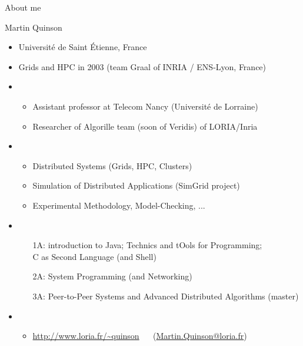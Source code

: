 \begin{frame}{About me}
  \begin{block}{Martin Quinson}
    \begin{itemize}
    \item {} Universit\'e de Saint \'Etienne, France
    \item {} Grids and HPC in 2003 (team Graal of INRIA /
      ENS-Lyon, France)
    \item {}
      \begin{itemize}
      \item Assistant professor at Telecom Nancy (Université de Lorraine)
      \item Researcher of Algorille team (soon of Veridis) of LORIA/Inria
      \end{itemize}
    \item {}
      \begin{itemize}
      \item {} Distributed Systems (Grids, HPC, Clusters)
      \item {} Simulation of Distributed Applications (SimGrid
        project) 
      \item {} Experimental Methodology, Model-Checking, ...
      \end{itemize}
    \item {}
      \begin{itemize}
      \item[1A:]  introduction to Java;
         Technics and tOols for Programming;\\
         C as Second Language (and Shell)
      \item[2A:]  System Programming (and Networking)
      \item[3A:] Peer-to-Peer Systems and Advanced Distributed Algorithms
        (master)
      \end{itemize}

    \item {}
      \begin{itemize}
      \item \url{http://www.loria.fr/~quinson} ~~
      (\url{Martin.Quinson@loria.fr})
      \end{itemize}
    \end{itemize}
  \end{block}
\end{frame}
